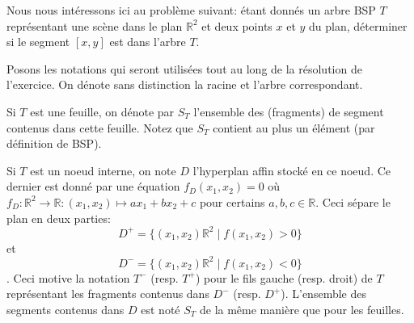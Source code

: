 
Nous nous intéressons ici au problème suivant: étant donnés
un arbre BSP $T$ représentant une scène dans le plan $\mathbb{R}^2$
et deux points $x$ et $y$ du plan, déterminer si le segment $[x, y]$
est dans l'arbre $T$.

Posons les notations qui seront utilisées tout au long de la
résolution de l'exercice. On dénote sans distinction la racine et
l'arbre correspondant.

Si $T$ est une feuille, on dénote par $S_T$ l'ensemble des (fragments)
de segment contenus dans cette feuille.
Notez que $S_T$ contient au plus un élément (par définition de BSP).

Si $T$ est un noeud interne, on note $D$ l'hyperplan affin stocké
en ce noeud. Ce dernier est donné par une équation $f_D(x_1, x_2) = 0$
où $f_D: \mathbb{R}^2 \to \mathbb{R}: (x_1, x_2)\mapsto a x_1 + b x_2 +c$
pour certains $a, b, c\in\mathbb{R}$. Ceci sépare le plan en deux
parties: $$D^+=\{(x_1, x_2)\mathbb{R}^2\mid f(x_1, x_2) > 0\}$$ et
$$D^-=\{(x_1, x_2)\mathbb{R}^2\mid f(x_1, x_2) < 0\}$$.
Ceci motive la notation $T^-$ (resp. $T^+$) pour le fils gauche
(resp. droit) de $T$ représentant les fragments contenus dans $D^-$
(resp. $D^+$). L'ensemble des segments contenus dans $D$ est noté
$S_T$ de la même manière que pour les feuilles.
